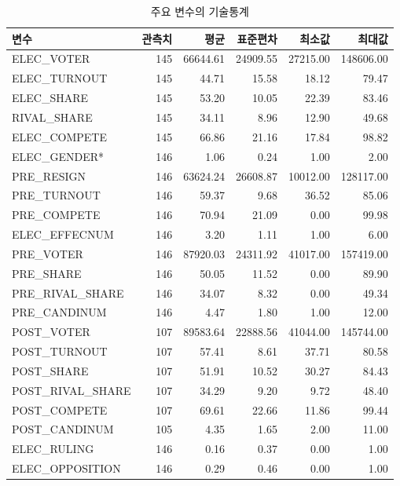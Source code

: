 \documentclass[
  11pt,
  letter]{article}
\begin{document}
\begin{longtable}[t]{l|r|r|r|r|r}
\caption{\label{tab:unnamed-chunk-22}주요 변수의 기술통계}\\
\hline
변수 & 관측치 & 평균 & 표준편차 & 최소값 & 최대값\\
\hline
ELEC\_VOTER & 145 & 66644.61 & 24909.55 & 27215.00 & 148606.00\\
\hline
ELEC\_TURNOUT & 145 & 44.71 & 15.58 & 18.12 & 79.47\\
\hline
ELEC\_SHARE & 145 & 53.20 & 10.05 & 22.39 & 83.46\\
\hline
RIVAL\_SHARE & 145 & 34.11 & 8.96 & 12.90 & 49.68\\
\hline
ELEC\_COMPETE & 145 & 66.86 & 21.16 & 17.84 & 98.82\\
\hline
ELEC\_GENDER* & 146 & 1.06 & 0.24 & 1.00 & 2.00\\
\hline
PRE\_RESIGN & 146 & 63624.24 & 26608.87 & 10012.00 & 128117.00\\
\hline
PRE\_TURNOUT & 146 & 59.37 & 9.68 & 36.52 & 85.06\\
\hline
PRE\_COMPETE & 146 & 70.94 & 21.09 & 0.00 & 99.98\\
\hline
ELEC\_EFFECNUM & 146 & 3.20 & 1.11 & 1.00 & 6.00\\
\hline
PRE\_VOTER & 146 & 87920.03 & 24311.92 & 41017.00 & 157419.00\\
\hline
PRE\_SHARE & 146 & 50.05 & 11.52 & 0.00 & 89.90\\
\hline
PRE\_RIVAL\_SHARE & 146 & 34.07 & 8.32 & 0.00 & 49.34\\
\hline
PRE\_CANDINUM & 146 & 4.47 & 1.80 & 1.00 & 12.00\\
\hline
POST\_VOTER & 107 & 89583.64 & 22888.56 & 41044.00 & 145744.00\\
\hline
POST\_TURNOUT & 107 & 57.41 & 8.61 & 37.71 & 80.58\\
\hline
POST\_SHARE & 107 & 51.91 & 10.52 & 30.27 & 84.43\\
\hline
POST\_RIVAL\_SHARE & 107 & 34.29 & 9.20 & 9.72 & 48.40\\
\hline
POST\_COMPETE & 107 & 69.61 & 22.66 & 11.86 & 99.44\\
\hline
POST\_CANDINUM & 105 & 4.35 & 1.65 & 2.00 & 11.00\\
\hline
ELEC\_RULING & 146 & 0.16 & 0.37 & 0.00 & 1.00\\
\hline
ELEC\_OPPOSITION & 146 & 0.29 & 0.46 & 0.00 & 1.00\\
\hline
\end{longtable}
\end{document}
